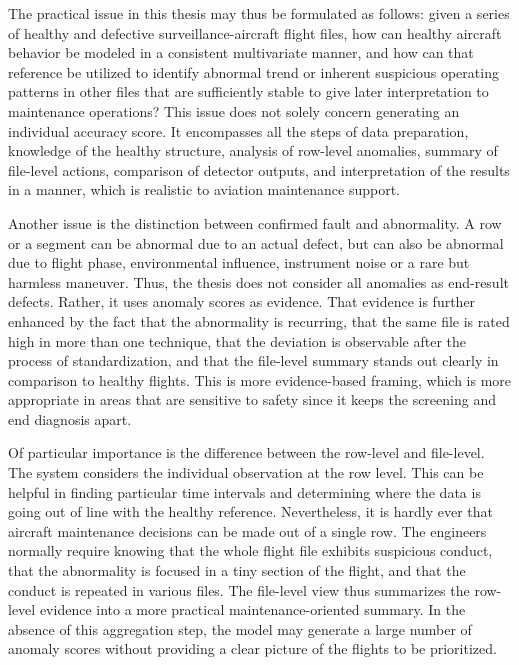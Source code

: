 \documentclass[12pt,a4paper]{report}
\begin{document}
	The practical issue in this thesis may thus be formulated as follows: given a series of healthy and defective surveillance-aircraft flight files, how can healthy aircraft behavior be modeled in a consistent multivariate manner, and how can that reference be utilized to identify abnormal trend or inherent suspicious operating patterns in other files that are sufficiently stable to give later interpretation to maintenance operations? This issue does not solely concern generating an individual accuracy score. It encompasses all the steps of data preparation, knowledge of the healthy structure, analysis of row-level anomalies, summary of file-level actions, comparison of detector outputs, and interpretation of the results in a manner, which is realistic to aviation maintenance support.
	
	Another issue is the distinction between confirmed fault and abnormality. A row or a segment can be abnormal due to an actual defect, but can also be abnormal due to flight phase, environmental influence, instrument noise or a rare but harmless maneuver. Thus, the thesis does not consider all anomalies as end-result defects. Rather, it uses anomaly scores as evidence. That evidence is further enhanced by the fact that the abnormality is recurring, that the same file is rated high in more than one technique, that the deviation is observable after the process of standardization, and that the file-level summary stands out clearly in comparison to healthy flights. This is more evidence-based framing, which is more appropriate in areas that are sensitive to safety since it keeps the screening and end diagnosis apart.
	
	Of particular importance is the difference between the row-level and file-level. The system considers the individual observation at the row level. This can be helpful in finding particular time intervals and determining where the data is going out of line with the healthy reference. Nevertheless, it is hardly ever that aircraft maintenance decisions can be made out of a single row. The engineers normally require knowing that the whole flight file exhibits suspicious conduct, that the abnormality is focused in a tiny section of the flight, and that the conduct is repeated in various files. The file-level view thus summarizes the row-level evidence into a more practical maintenance-oriented summary. In the absence of this aggregation step, the model may generate a large number of anomaly scores without providing a clear picture of the flights to be prioritized.
	
\end{document}
